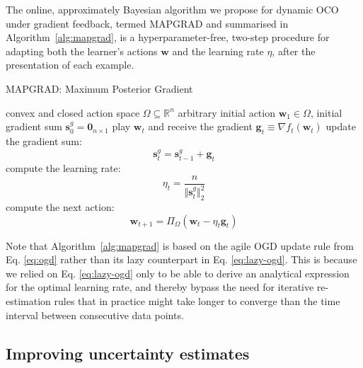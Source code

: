 \begin{mccorrection}
The online, approximately Bayesian algorithm we propose for dynamic OCO under gradient feedback, termed MAPGRAD and summarised in Algorithm~\ref{alg:mapgrad}, is a hyperparameter-free, two-step procedure for adapting both the learner's actions $\mathbf{w}$ and the learning rate $\eta$, after the presentation of each example.
\begin{algorithm}[H]
\caption{MAPGRAD: Maximum Posterior Gradient}
\label{alg:mapgrad}
\begin{algorithmic}[1]
	 convex and closed action space $\Omega \subseteq \mathbb{R}^n$
	 arbitrary initial action $\mathbf{w}_1 \in \Omega$, initial gradient sum $\mathbf{s}_0^g = \mathbf{0}_{n \times 1}$
		\STATE play $\mathbf{w}_t$ and receive the gradient $\mathbf{g}_t \equiv \nabla f_t(\mathbf{w}_t)$
		\STATE update the gradient sum:
		\begin{equation*}
			\mathbf{s}_t^g
			= \mathbf{s}_{t-1}^g + \mathbf{g}_t
		\end{equation*}
		\STATE compute the learning rate:
			\begin{equation*}
				\eta_t
				= \frac{n}{\Vert\mathbf{s}_t^g\Vert_2^2}
			\end{equation*}		
		\STATE compute the next action:
			\begin{equation*}
				\mathbf{w}_{t+1}
				= \Pi_{\Omega}(\mathbf{w}_t - \eta_t\mathbf{g}_t)
			\end{equation*}
	\ENDFOR
\end{algorithmic}
\end{algorithm}
\end{mccorrection}
Note that Algorithm~\ref{alg:mapgrad} is based on the agile OGD update rule from Eq. \eqref{eq:ogd} rather than its lazy counterpart in Eq. \eqref{eq:lazy-ogd}. This is because we relied on Eq. \eqref{eq:lazy-ogd} only to be able to derive an analytical expression for the optimal learning rate, and thereby bypass the need for iterative re-estimation rules that in practice might take longer to converge than the time interval between consecutive data points.

\subsection{Improving uncertainty estimates}

